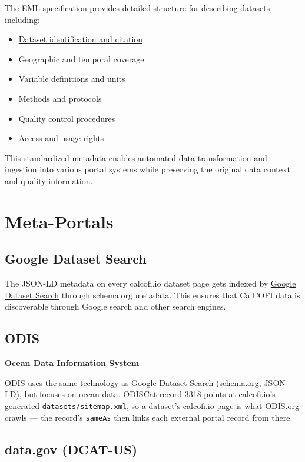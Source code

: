 \documentclass[
  letterpaper,
  DIV=11,
  numbers=noendperiod]{scrreprt}
\providecommand{\tightlist}{%
  \setlength{\itemsep}{0pt}\setlength{\parskip}{0pt}}
\begin{document}
The EML specification provides detailed structure for describing
datasets, including:

\begin{itemize}
\tightlist
\item
  \hyperref[cite-this-data]{Dataset identification and citation}
\item
  Geographic and temporal coverage
\item
  Variable definitions and units
\item
  Methods and protocols
\item
  Quality control procedures
\item
  Access and usage rights
\end{itemize}

This standardized metadata enables automated data transformation and
ingestion into various portal systems while preserving the original data
context and quality information.

\section{Meta-Portals}\label{meta-portals}

\subsection{Google Dataset Search}\label{google-dataset-search}

The JSON-LD metadata on every calcofi.io dataset page gets indexed by
\href{https://datasetsearch.research.google.com/search?query=calcofi}{Google
Dataset Search} through schema.org metadata. This ensures that CalCOFI
data is discoverable through Google search and other search engines.

\subsection{ODIS}\label{odis}

\textbf{Ocean Data Information System}

ODIS uses the same technology as Google Dataset Search (schema.org,
JSON-LD), but focuses on ocean data. ODISCat record 3318 points at
calcofi.io's generated
\href{https://calcofi.io/datasets/sitemap.xml}{\texttt{datasets/sitemap.xml}},
so a dataset's calcofi.io page is what \href{https://odis.org}{ODIS.org}
crawls --- the record's \texttt{sameAs} then links each external portal
record from there.

\subsection{data.gov (DCAT-US)}\label{data.gov-dcat-us}
\end{document}
